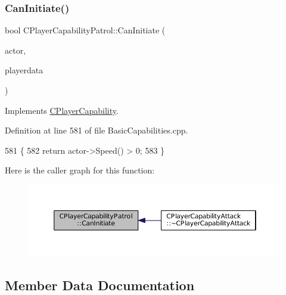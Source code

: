 \subsubsection{\texorpdfstring{Can\+Initiate()}{CanInitiate()}}
{\footnotesize\ttfamily bool C\+Player\+Capability\+Patrol\+::\+Can\+Initiate (\begin{DoxyParamCaption}\item[{std\+::shared\+\_\+ptr$<$ \hyperlink{classCPlayerAsset}{C\+Player\+Asset} $>$}]{actor,  }\item[{std\+::shared\+\_\+ptr$<$ \hyperlink{classCPlayerData}{C\+Player\+Data} $>$}]{playerdata }\end{DoxyParamCaption})\hspace{0.3cm}{\ttfamily [virtual]}}



Implements \hyperlink{classCPlayerCapability_aa83b1e1fcaff2985c378132d679154ea}{C\+Player\+Capability}.



Definition at line 581 of file Basic\+Capabilities.\+cpp.


\begin{DoxyCode}
581                                                                                                            
                \{
582     \textcolor{keywordflow}{return} actor->Speed() > 0;
583 \}
\end{DoxyCode}
Here is the caller graph for this function\+:\nopagebreak
\begin{figure}[H]
\begin{center}
\leavevmode
\includegraphics[width=350pt]{classCPlayerCapabilityPatrol_a48e60ecd544759f3aad66afeb4a6e0a9_icgraph}
\end{center}
\end{figure}


\subsection{Member Data Documentation}
\hypertarget{classCPlayerCapabilityPatrol_af3e88478d9266aa4c7f2f0457da84e89}{}\label{classCPlayerCapabilityPatrol_af3e88478d9266aa4c7f2f0457da84e89} 
